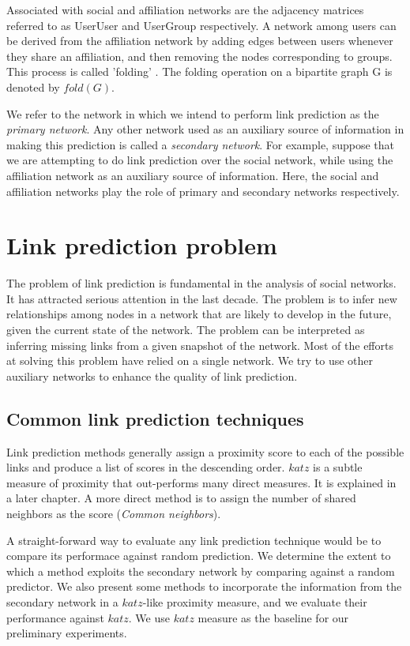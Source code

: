 \documentclass{report}
\begin{document}
Associated with social and affiliation networks are the adjacency matrices referred to as UserUser and UserGroup respectively. A network among users can be derived from the affiliation network by adding edges between users whenever they share an affiliation, and then removing the nodes corresponding to groups. This process is called 'folding' \cite{sivakumarAffiliation}. The folding operation on a bipartite graph G is denoted by $fold(G)$.

We refer to the network in which we intend to perform link prediction as the \textit{primary network}. Any other network used as an auxiliary source of information in making this prediction is called a \textit{secondary network}. For example, suppose that we are attempting to do link prediction over the social network, while using the affiliation network as an auxiliary source of information. Here, the social and affiliation networks play the role of primary and secondary networks respectively.

\section {Link prediction problem}
The problem of link prediction is fundamental in the analysis of social networks. It has attracted serious attention in the last decade. The problem is to infer new relationships among nodes in a network that are likely to develop in the future, given the current state of the network. The problem can be interpreted as inferring missing links from a given snapshot of the network. Most of the efforts at solving this problem have relied on a single network. We try to use other auxiliary networks to enhance the quality of link prediction.

\subsection{Common link prediction techniques}
Link prediction methods generally assign a proximity score to each of the possible links and produce a list of scores in the descending order. $katz$ is a subtle measure of proximity that out-performs many direct measures. It is explained in a later chapter. A more direct method is to assign the number of shared neighbors as the score (\textit{Common neighbors}).

A straight-forward way to evaluate any link prediction technique would be to compare its performace against random prediction\cite{kleinberg}. We determine the extent to which a method exploits the secondary network by comparing against a random predictor. We also present some methods to incorporate the information from the secondary network in a $katz$-like proximity measure, and we evaluate their performance against $katz$. We use $katz$ measure as the baseline for our preliminary experiments.
\end{document}
